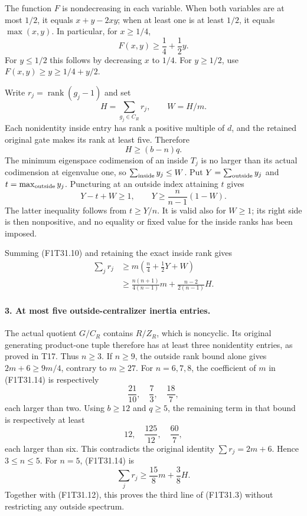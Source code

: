The function \(F\) is nondecreasing in each variable.
When both variables are at most \(1/2\), it equals
\(x+y-2xy\); when at least one is at least \(1/2\),
it equals \(\max(x,y)\). In particular, for \(x\ge1/4\),
\[
                  F(x,y)\ge\frac14+\frac12y.
 \tag{F1T31.10}
\]
For \(y\le1/2\) this follows by decreasing \(x\) to
\(1/4\). For \(y\ge1/2\), use
\(F(x,y)\ge y\ge1/4+y/2\).

Write \(r_j=\operatorname{rank}(g_j-1)\) and set
\[
 H=\sum_{g_j\in C_R}r_j,\qquad W=H/m.
 \tag{F1T31.11}
\]
Each nonidentity inside entry has rank a positive multiple
of \(d\), and the retained original gate makes its rank
at least five. Therefore
\[
                  H\ge(b-n)q.
 \tag{F1T31.12}
\]
The minimum eigenspace codimension of an inside \(T_j\)
is no larger than its actual codimension at eigenvalue one,
so \(\sum_{\rm inside}y_j\le W\). Put
\(Y=\sum_{\rm outside}y_j\) and
\(t=\max_{\rm outside}y_j\). Puncturing at an outside
index attaining \(t\) gives
\[
        Y-t+W\ge1,
        \qquad Y\ge\frac{n}{n-1}(1-W).
 \tag{F1T31.13}
\]
The latter inequality follows from \(t\ge Y/n\).
It is valid also for \(W\ge1\); its right side is
then nonpositive, and no equality or fixed value for
the inside ranks has been imposed.

Summing (F1T31.10) and retaining the exact inside rank gives
\[
 \begin{split}
 \sum_j r_j
  &\ge m\left(\frac n4+\frac12Y+W\right)\\
  &\ge\frac{n(n+1)}{4(n-1)}m
             +\frac{n-2}{2(n-1)}H.
 \end{split}
 \tag{F1T31.14}
\]

\paragraph{3. At most five outside-centralizer inertia entries.}
The actual quotient \(G/C_R\) contains \(R/Z_R\),
which is noncyclic. Its original generating product-one
tuple therefore has at least three nonidentity entries,
as proved in T17. Thus \(n\ge3\).
If \(n\ge9\), the outside rank bound alone gives
\(2m+6\ge9m/4\), contrary to \(m\ge27\).
For \(n=6,7,8\), the coefficient of \(m\) in
(F1T31.14) is respectively
\[
                   \frac{21}{10},\quad\frac73,
                         \quad\frac{18}{7},
\]
each larger than two. Using \(b\ge12\) and \(q\ge5\),
the remaining term in that bound is respectively at least
\[
                    12,\quad\frac{125}{12},
                              \quad\frac{60}{7},
\]
each larger than six. This contradicts the original
identity \(\sum r_j=2m+6\). Hence \(3\le n\le5\).
For \(n=5\), (F1T31.14) is
\[
                \sum_jr_j\ge\frac{15}{8}m+\frac38H.
 \tag{F1T31.15}
\]
Together with (F1T31.12), this proves the third line
of (F1T31.3) without restricting any outside spectrum.

